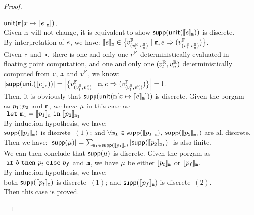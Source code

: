 \documentclass[a4paper,11pt]{article}
\begin{document}
\begin{proof}
\begin{itemize}
	$\mathsf{unit}(\mathtt{m}[x \mapsto \llbracket e \rrbracket_{\mathtt{m}}])$.
	\\
	Given $\mathtt{m}$ will not change, it is equivalent to show 
	$\mathsf{supp}(\mathsf{unit}(\llbracket e \rrbracket_{\mathtt{m}}))$ is discrete.
	\\
	By interpretation of $e$, we have: 
	$\llbracket e \rrbracket_{\mathtt{m}} \in  
	\big\{v^{\mathbb{F}}_{(v^{\mathbb{R}}_{l}, v^{\mathbb{R}}_{u})} ~|~
	\mathtt{m},  
	e \Rightarrow (v^{\mathbb{F}}_{(v^{\mathbb{R}}_{l}, v^{\mathbb{R}}_{u})})\big\}$.
	\\
	Given $e$ and $\mathtt{m}$, 
	there is one and only one $v^{\mathbb{F}}$ deterministically evaluated in floating point computation, and one and only one $(v^{\mathbb{R}}_{l}, v^{\mathbb{R}}_{u})$ deterministically computed from $e$, $\mathtt{m}$ and $v^{\mathbb{F}}$, we know:
	\\
	$\left \vert \mathsf{supp}(\mathsf{unit}(\llbracket e \rrbracket_{\mathtt{m}})) \right \vert  
	= 
	\left \vert \big\{v^{\mathbb{F}}_{(v^{\mathbb{R}}_{l}, v^{\mathbb{R}}_{u})} ~|~
		\mathtt{m},  
		e \Rightarrow (v^{\mathbb{F}}_{(v^{\mathbb{R}}_{l}, v^{\mathbb{R}}_{u})})\big\} \right \vert  = 1$.
	\\
		Then, it is obviously that $\mathsf{supp}(\mathsf{unit}(\mathtt{m}[x \mapsto \llbracket e \rrbracket_{\mathtt{m}}]))$ is discrete.
	Given the porgam as $p_1; p_2$ and $\mathtt{m}$, 
	we have $\mu$ in this case as:
	\\
	$~\mathtt{let}~  \mathtt{m}_1 = 
	 	\llbracket p_1 \rrbracket_{\mathtt{m}} ~\mathtt{in}~
	 	\llbracket p_2 \rrbracket_{\mathtt{m}_1}$ 
	 \\
	 By induction hypothesis, we have:
	 \\
	 $\mathsf{supp}(\llbracket p_1 \rrbracket_{\mathtt{m}})$ is discrete $~(1)$; and 
	 $\forall \mathtt{m}_1 \in \mathsf{supp}(\llbracket p_1 \rrbracket_{\mathtt{m}})$, $\mathsf{supp}(\llbracket p_2 \rrbracket_{\mathtt{m}_1})$ are all discrete.
	 \\
	 Then we have: $\left \vert \mathsf{supp}(\mu) \right \vert = \sum_{\mathtt{m}_1 \in \mathsf{supp}(\llbracket p_1 \rrbracket_{\mathtt{m}})} \left \vert \mathsf{supp}(\llbracket p_2 \rrbracket_{\mathtt{m}_1}) \right \vert$ is also finite.
	 \\
	 We can then conclude that $\mathsf{supp}(\mu)$ is discrete.
	Given the porgam as $~\mathtt{if}~ b ~\mathtt{then}~ p_t ~\mathtt{else}~ p_f$ 
	and $\mathtt{m}$, 
	we have $\mu$ be either $\llbracket p_t \rrbracket_{\mathtt{m}}$ or $\llbracket p_f \rrbracket_{\mathtt{m}}$.
	 \\
	 By induction hypothesis, we have:
	 \\
	 both $\mathsf{supp}(\llbracket p_t \rrbracket_{\mathtt{m}})$ is discrete $~(1)$; and $\mathsf{supp}(\llbracket p_f \rrbracket_{\mathtt{m}})$ is discrete $~(2)$.
	 \\
	Then this case is proved.

\end{itemize}
\end{proof}
\end{document}
